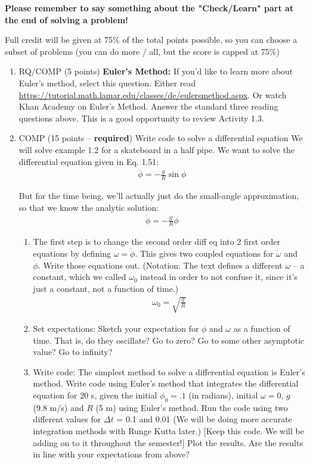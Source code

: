 \documentclass[12pt]{article}
\begin{document}
\textbf{Please remember to say something about the "Check/Learn" part at the end of solving a problem!}

Full credit will be given at 75\% of the total points possible, so you can choose a subset of problems (you can do more / all, but the score is capped at 75\%)

\begin{enumerate}
  \item	RQ/COMP (5 points) \textbf{Euler's Method:} If you'd like to learn more about Euler's method, select this question. Either read \url{https://tutorial.math.lamar.edu/classes/de/eulersmethod.aspx}.  Or watch Khan Academy on Euler's Method.  Answer the standard three reading questions above. This is a good opportunity to review Activity 1.3.

	\item COMP (15 points -- \textbf{required}) Write code to solve a differential equation We will solve example 1.2 for a skateboard in a half pipe.  We want to solve the differential equation given in Eq. 1.51:
  \begin{align}
    \ddot \phi = -\frac{g}{R} \sin \phi
  \end{align}

  But for the time being, we'll actually just do the small-angle approximation, so that we know the analytic solution:
  \begin{align}
    \ddot \phi = -\frac{g}{R} \phi
  \end{align}

  \begin{enumerate}
  \item	The first step is to change the second order diff eq into 2 first order equations by defining $\omega = \dot \phi$.  This gives two coupled equations for $\dot \omega$ and $\dot \phi$.  Write those equations out.  (Notation:  The text defines a different $\omega$ -- a constant, which we called $\omega_0$ instead in order to not confuse it, since it's just a constant, not a function of time.)
  \begin{align}
    \omega_0 = \sqrt{\frac{g}{R}}
  \end{align}

  \item Set expectations: Sketch your expectation for $\phi$ and $\omega$ as a function of time.  That is, do they oscillate?  Go to zero? Go to some other asymptotic value? Go to infinity?

  \item	Write code: The simplest method to solve a differential equation is Euler's method.  Write code using Euler's method that integrates the differential equation for 20 s, given the initial $\phi_0 = .1$ (in radians), initial $\omega = 0$, $g$ (9.8 m/s) and $R$ (5 m) using Euler's method.  Run the code using two different values for $\Delta t$ = 0.1 and 0.01  (We will be doing more accurate integration methods with Runge Kutta later.)  [Keep this code.  We will be adding on to it throughout the semester!]
	Plot the results.  Are the results in line with your expectations from above?
  \end{enumerate}



\end{enumerate}
\end{document}
